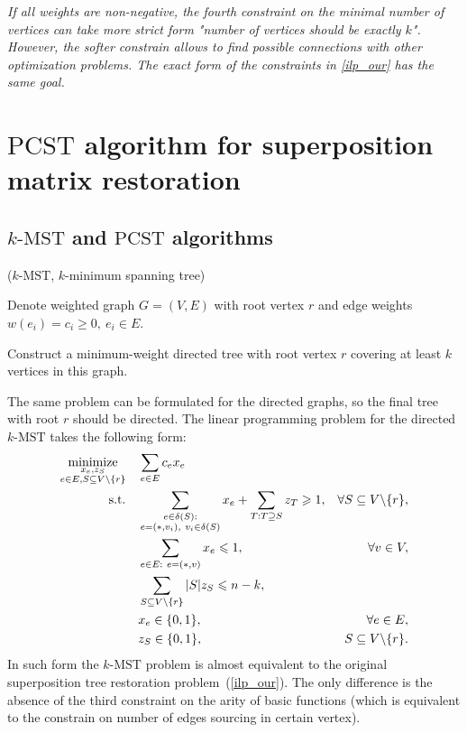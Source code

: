 \documentclass[11pt, tightenlines, twoside, onecolumn, nofloats, nobibnotes, nofootinbib, superscriptaddress, noshowpacks, centertags]{revtex4}
\begin{document}
\emph{If all weights are non-negative, the fourth constraint on the minimal number of vertices can take more strict form "number of vertices should be exactly $k$". However, the softer constrain allows to find possible connections with other optimization problems. The exact form of the constraints in \ref{ilp_our} has the same goal.}


\section{$\text{PCST}$ algorithm for superposition matrix restoration}
\subsection{$k\text{-MST}$ and  $\text{PCST}$ algorithms}

\begin{definition}{($k\text{-MST}$, $k$-minimum spanning tree)}
    
    Denote weighted graph $G=(V,E)$ with root vertex $r$ and edge weights $w(e_i)=c_i\geqslant 0,~e_i\in E$.
    
    Construct a minimum-weight directed tree with root vertex $r$ covering at least $k$ vertices in this graph.
\end{definition}

The same problem can be formulated for the directed graphs, so the final tree with root $r$ should be directed. The linear programming problem for the directed $k\text{-MST}$ takes the following form:
\begin{align}
\underset{\substack{x_e,z_S \\ e\in E, S\subseteq V\backslash \{r\}}}{\text{minimize}}\quad & \sum\limits_{e\in E}c_ex_e \nonumber\\
\text{s.t.\quad} & \sum\limits_{\substack{e\in\delta(S):\\e=(\ast,v_i),~ v_i\in\delta(S)}}x_e + \sum\limits_{T:T\supseteq S}z_T\geqslant 1, & \forall S\subseteq V\backslash \{r\},\nonumber\\
& \sum\limits_{e\in E:~e=(\ast,v)}x_e\leqslant 1, & \forall v\in V,
\label{ilp_k_mst_ord}\\
& \sum\limits_{S\subseteq V\backslash \{r\}}|S|z_S \leqslant n-k,\nonumber\\
& x_e\in\{0,1\}, &\forall e\in E,\nonumber\\
& z_S\in\{0,1\}, & S\subseteq V\backslash \{r\}.\nonumber
\end{align}
In such form the $k\text{-MST}$ problem is almost equivalent to the original superposition tree restoration problem~(\ref{ilp_our}). The only difference is the absence of the third constraint on the arity of basic functions (which is equivalent to the constrain on number of edges sourcing in certain vertex).
\end{document}
